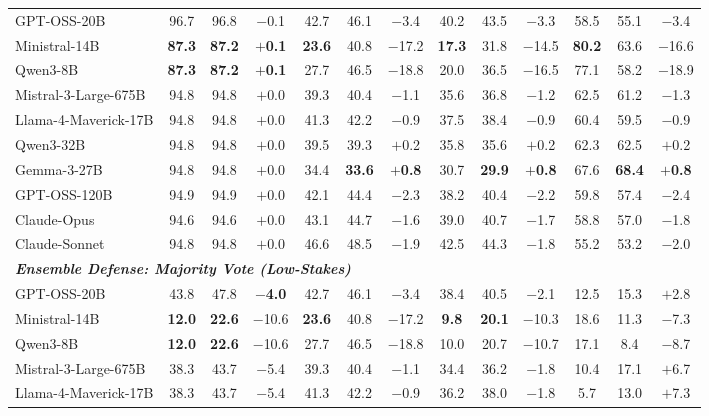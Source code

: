 \begin{table}[t]
{\begin{tabular}{l ccc ccc ccc ccc}
GPT-OSS-20B            & 96.7 & 96.8 & $-$0.1 & 42.7 & 46.1 & $-$3.4 & 40.2 & 43.5 & $-$3.3 & 58.5 & 55.1 & $-$3.4 \\
Ministral-14B          & \textbf{87.3} & \textbf{87.2} & \textbf{$+$0.1} & \textbf{23.6} & 40.8 & $-$17.2 & \textbf{17.3} & 31.8 & $-$14.5 & \textbf{80.2} & 63.6 & $-$16.6 \\
Qwen3-8B               & \textbf{87.3} & \textbf{87.2} & \textbf{$+$0.1} & 27.7 & 46.5 & $-$18.8 & 20.0 & 36.5 & $-$16.5 & 77.1 & 58.2 & $-$18.9 \\
Mistral-3-Large-675B   & 94.8 & 94.8 & $+$0.0 & 39.3 & 40.4 & $-$1.1 & 35.6 & 36.8 & $-$1.2 & 62.5 & 61.2 & $-$1.3 \\
Llama-4-Maverick-17B   & 94.8 & 94.8 & $+$0.0 & 41.3 & 42.2 & $-$0.9 & 37.5 & 38.4 & $-$0.9 & 60.4 & 59.5 & $-$0.9 \\
Qwen3-32B              & 94.8 & 94.8 & $+$0.0 & 39.5 & 39.3 & $+$0.2 & 35.8 & 35.6 & $+$0.2 & 62.3 & 62.5 & $+$0.2 \\
Gemma-3-27B            & 94.8 & 94.8 & $+$0.0 & 34.4 & \textbf{33.6} & \textbf{$+$0.8} & 30.7 & \textbf{29.9} & \textbf{$+$0.8} & 67.6 & \textbf{68.4} & \textbf{$+$0.8} \\
GPT-OSS-120B           & 94.9 & 94.9 & $+$0.0 & 42.1 & 44.4 & $-$2.3 & 38.2 & 40.4 & $-$2.2 & 59.8 & 57.4 & $-$2.4 \\
Claude-Opus            & 94.6 & 94.6 & $+$0.0 & 43.1 & 44.7 & $-$1.6 & 39.0 & 40.7 & $-$1.7 & 58.8 & 57.0 & $-$1.8 \\
Claude-Sonnet          & 94.8 & 94.8 & $+$0.0 & 46.6 & 48.5 & $-$1.9 & 42.5 & 44.3 & $-$1.8 & 55.2 & 53.2 & $-$2.0 \\
\midrule
\multicolumn{13}{l}{\textbf{\textit{Ensemble Defense: Majority Vote (Low-Stakes)}}} \\
GPT-OSS-20B            & 43.8 & 47.8 & \textbf{$-$4.0} & 42.7 & 46.1 & $-$3.4 & 38.4 & 40.5 & $-$2.1 & 12.5 & 15.3 & $+$2.8 \\
Ministral-14B          & \textbf{12.0} & \textbf{22.6} & $-$10.6 & \textbf{23.6} & 40.8 & $-$17.2 & \textbf{9.8} & \textbf{20.1} & $-$10.3 & 18.6 & 11.3 & $-$7.3 \\
Qwen3-8B               & \textbf{12.0} & \textbf{22.6} & $-$10.6 & 27.7 & 46.5 & $-$18.8 & 10.0 & 20.7 & $-$10.7 & 17.1 & 8.4 & $-$8.7 \\
Mistral-3-Large-675B   & 38.3 & 43.7 & $-$5.4 & 39.3 & 40.4 & $-$1.1 & 34.4 & 36.2 & $-$1.8 & 10.4 & 17.1 & $+$6.7 \\
Llama-4-Maverick-17B   & 38.3 & 43.7 & $-$5.4 & 41.3 & 42.2 & $-$0.9 & 36.2 & 38.0 & $-$1.8 & 5.7 & 13.0 & $+$7.3 \\

\end{tabular}}
\end{table}
